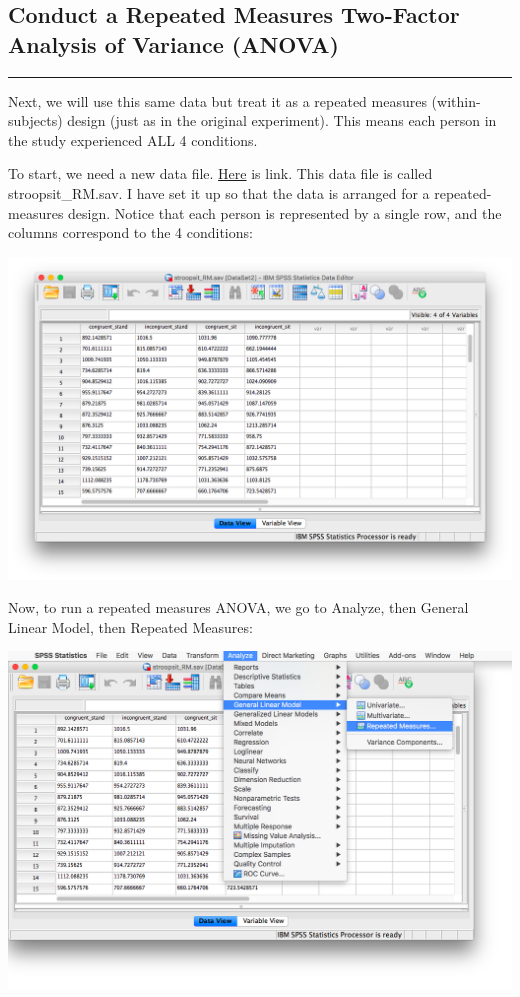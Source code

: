\documentclass[
]{book}
\begin{document}
\hypertarget{conduct-a-repeated-measures-two-factor-analysis-of-variance-anova}{%
\subsection{Conduct a Repeated Measures Two-Factor Analysis of Variance (ANOVA)}\label{conduct-a-repeated-measures-two-factor-analysis-of-variance-anova}}

\begin{center}\rule{0.5\linewidth}{0.5pt}\end{center}

Next, we will use this same data but treat it as a repeated measures (within-subjects) design (just as in the original experiment). This means each person in the study experienced ALL 4 conditions.

To start, we need a new data file. \href{https://github.com/CrumpLab/statisticsLab/blob/master/data/spssdata/stroopsit_RM.sav}{Here} is link. This data file is called stroopsit\_RM.sav. I have set it up so that the data is arranged for a repeated-measures design. Notice that each person is represented by a single row, and the columns correspond to the 4 conditions:

\includegraphics{img/10.4.23.png}

Now, to run a repeated measures ANOVA, we go to {Analyze}, then {General Linear Model}, then {Repeated Measures}:

\includegraphics{img/10.4.24.png}
\end{document}
